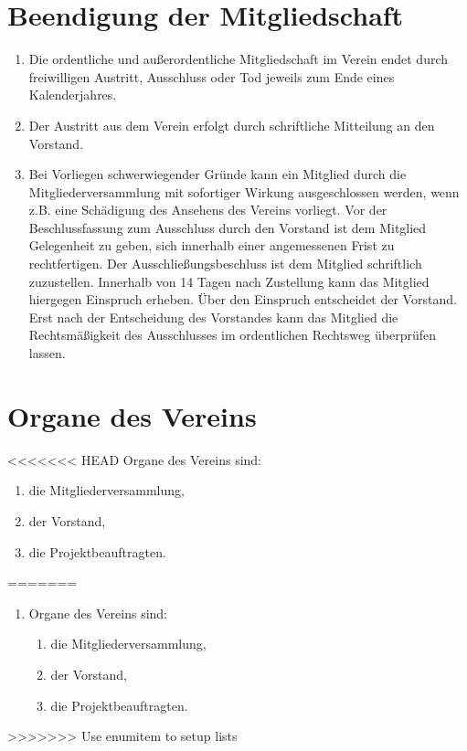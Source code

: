 \documentclass[
  fontsize=12pt,
  paper=a4,
  DIV14,
  parskip,
]{scrartcl}
\begin{document}
\section{Beendigung der Mitgliedschaft}

\begin{enumerate}
	\item Die ordentliche und außerordentliche Mitgliedschaft im Verein endet
		durch freiwilligen Austritt, Ausschluss oder Tod jeweils zum Ende eines
		Kalenderjahres.
	\item Der Austritt aus dem Verein erfolgt durch schriftliche Mitteilung an
		den Vorstand.
	\item Bei Vorliegen schwerwiegender Gründe kann ein Mitglied durch die
		Mitgliederversammlung mit sofortiger Wirkung ausgeschlossen werden,
		wenn z.B. eine Schädigung des Ansehens des Vereins vorliegt.
		Vor der Beschlussfassung zum Ausschluss durch den Vorstand ist dem
		Mitglied Gelegenheit zu geben, sich innerhalb einer angemessenen Frist
		zu rechtfertigen. Der Ausschließungsbeschluss ist dem Mitglied schriftlich
		zuzustellen. Innerhalb von 14 Tagen nach Zustellung kann das Mitglied
		hiergegen Einspruch erheben.
		Über den Einspruch entscheidet der Vorstand. Erst nach der Entscheidung
		des Vorstandes kann das Mitglied die Rechtsmäßigkeit des Ausschlusses im
		ordentlichen Rechtsweg überprüfen lassen.
\end{enumerate}

\section{Organe des Vereins}

<<<<<<< HEAD
Organe des Vereins sind:
	\begin{enumerate}
		\item die Mitgliederversammlung,
		\item der Vorstand,
		\item die Projektbeauftragten.
	\end{enumerate}
=======
\begin{enumerate}
	\item Organe des Vereins sind:
    \begin{enumerate}
      \item die Mitgliederversammlung,
      \item der Vorstand,
      \item die Projektbeauftragten.
    \end{enumerate}
\end{enumerate}
>>>>>>> Use enumitem to setup lists
\end{document}
